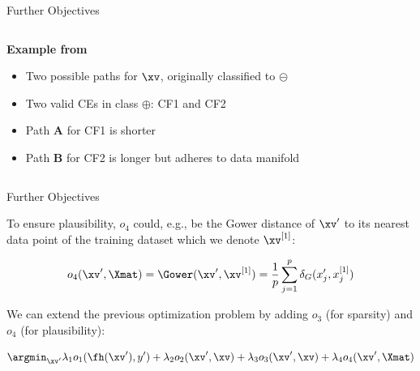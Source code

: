 \documentclass[11pt,compress,t,notes=noshow, aspectratio=169, xcolor=table, usenames,dvipsnames]{beamer}
\begin{document}
\begin{frame}{Further Objectives}
{\begin{columns}[c]
\begin{column}{0.6\textwidth}
\textbf{Example from } 
\begin{itemize}
    \item Two possible paths for \textcolor{blue}{$\xv$},			originally classified to $\pmb{\circleddash}$
    \item Two valid CEs in class $\pmb\oplus$: {\color{Red} CF1} and {\color{Green} CF2}
    \item {\color{Red} Path \textbf{A} for CF1} is shorter
    \item {\color{Green} Path \textbf{B} for CF2} is longer but adheres to data manifold
\end{itemize}
\end{column}
\end{columns}
}

\end{frame}


\begin{frame}{Further Objectives}

To ensure plausibility, $o_4$ could, e.g., be the Gower distance of $\xv'$ to its nearest data point of the training dataset which we denote $\xv^{[1]}$:
	
$$o_4(\xv', \Xmat) = \Gower(\xv', \xv^{[1]}) = \frac{1}{p} \sum_{j = 1}^{p}  \delta_G(x_j', x^{[1]}_j)$$

We can extend the previous optimization problem by adding $o_3$ (for sparsity) and $o_4$ (for plausibility):

$$\argmin_{\xv'} \lambda_1 o_1(\fh(\xv'), y') + \lambda_2 o_2(\xv', \xv) + \lambda_3 o_3(\xv', \xv) + \lambda_4 o_4(\xv', \Xmat)$$

\end{frame}
\end{document}
